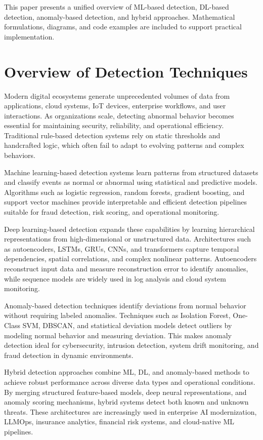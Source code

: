 \documentclass[12pt, draftclsnofoot, onecolumn]{IEEEtran}
\begin{document}
This paper presents a unified overview of ML-based detection, DL-based detection, anomaly-based detection, and hybrid approaches. Mathematical formulations, diagrams, and code examples are included to support practical implementation.

\section{Overview of Detection Techniques}
Modern digital ecosystems generate unprecedented volumes of data from applications, cloud systems, IoT devices, enterprise workflows, and user interactions. As organizations scale, detecting abnormal behavior becomes essential for maintaining security, reliability, and operational efficiency. Traditional rule-based detection systems rely on static thresholds and handcrafted logic, which often fail to adapt to evolving patterns and complex behaviors.

Machine learning-based detection systems learn patterns from structured datasets and classify events as normal or abnormal using statistical and predictive models. Algorithms such as logistic regression, random forests, gradient boosting, and support vector machines provide interpretable and efficient detection pipelines suitable for fraud detection, risk scoring, and operational monitoring.

Deep learning-based detection expands these capabilities by learning hierarchical representations from high-dimensional or unstructured data. Architectures such as autoencoders, LSTMs, GRUs, CNNs, and transformers capture temporal dependencies, spatial correlations, and complex nonlinear patterns. Autoencoders reconstruct input data and measure reconstruction error to identify anomalies, while sequence models are widely used in log analysis and cloud system monitoring.

Anomaly-based detection techniques identify deviations from normal behavior without requiring labeled anomalies. Techniques such as Isolation Forest, One-Class SVM, DBSCAN, and statistical deviation models detect outliers by modeling normal behavior and measuring deviation. This makes anomaly detection ideal for cybersecurity, intrusion detection, system drift monitoring, and fraud detection in dynamic environments.

Hybrid detection approaches combine ML, DL, and anomaly-based methods to achieve robust performance across diverse data types and operational conditions. By merging structured feature-based models, deep neural representations, and anomaly scoring mechanisms, hybrid systems detect both known and unknown threats. These architectures are increasingly used in enterprise AI modernization, LLMOps, insurance analytics, financial risk systems, and cloud-native ML pipelines.
\end{document}
